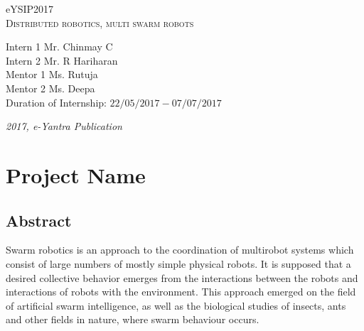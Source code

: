 \documentclass[a4paper,12pt,oneside]{book}
\begin{document}
\begin{titlepage}
\raggedright
{\Large eYSIP2017\\[1cm]}
{\Huge\scshape Distributed robotics, multi swarm robots \\[.1in]}
\vfill
\begin{flushright}
{\large Intern 1 Mr. Chinmay C \\}
{\large Intern 2 Mr. R Hariharan \\}
{\large Mentor 1 Ms. Rutuja \\}
{\large Mentor 2 Ms. Deepa \\}
{\large Duration of Internship: $ 22/05/2017-07/07/2017 $ \\}
\end{flushright}

{\itshape 2017, e-Yantra Publication}
\end{titlepage}

\chapter[Project Tag]{Project Name}
\section*{Abstract}
Swarm robotics is an approach to the coordination of multirobot systems which consist of large numbers of mostly simple physical robots. It is supposed that a desired collective behavior emerges from the interactions between the robots and interactions of robots with the environment. This approach emerged on the field of artificial swarm intelligence, as well as the biological studies of insects, ants and other fields in nature, where swarm behaviour occurs.
\end{document}
